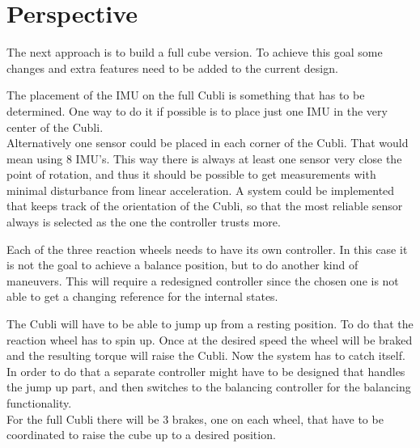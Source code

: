 \chapter{Perspective}
The next approach is to build a full cube version. To achieve this goal some changes and extra features need to be added to the current design.

The placement of the IMU on the full Cubli is something that has to be determined. One way to do it if possible is to place just one IMU in the very center of the Cubli.\\
Alternatively one sensor could be placed in each corner of the Cubli. That would mean using 8 IMU's. This way there is always at least one sensor very close the point of rotation, and thus it should be possible to get measurements with minimal disturbance from linear acceleration. A system could be implemented that keeps track of the orientation of the Cubli, so that the most reliable sensor always is selected as the one the controller trusts more.

Each of the three reaction wheels needs to have its own controller. In this case it is not the goal to achieve a balance position, but to do another kind of maneuvers. This will require a redesigned controller since the chosen one is not able to get a changing reference for the internal states.

The Cubli will have to be able to jump up from a resting position. To do that the reaction wheel has to spin up. Once at the desired speed the wheel will be braked and the resulting torque will raise the Cubli. Now the system has to catch itself. In order to do that a separate controller might have to be designed that handles the jump up part, and then switches to the balancing controller for the balancing functionality.\\
For the full Cubli there will be 3 brakes, one on each wheel, that have to be coordinated to raise the cube up to a desired position.

